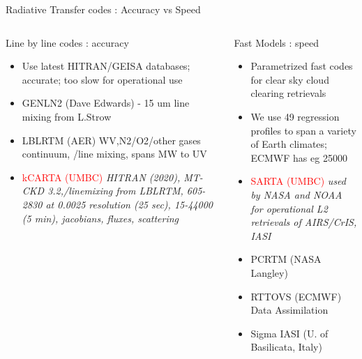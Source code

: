 \documentclass[10pt,t]{beamer}
\begin{document}
\begin{frame}[shrink=2]{Radiative Transfer codes : Accuracy vs Speed}
\vspace{-0.1in}
\begin{columns}

\begin{column}{0.55\columnwidth}
\begin{block}{Line by line codes : accuracy}
  \begin{itemize}
  \item Use latest HITRAN/GEISA databases; accurate; too slow for operational use
  \item GENLN2 (Dave Edwards) - 15 um \cd line mixing from L.Strow
  \item LBLRTM (AER) WV,N2/O2/other gases continuum, \cd/\methane line mixing, spans MW to UV
  \item \textcolor{red}{kCARTA (UMBC)} \emph{HITRAN (2020), MT-CKD 3.2,\cd/\methane linemixing from LBLRTM, 
        605-2830 \wn at 0.0025 \wn resolution (25 sec), 15-44000 \wn (5 min), jacobians, 
        fluxes, scattering}
  \end{itemize}
\end{block}
\end{column}

\begin{column}{0.55\columnwidth}
\begin{block}{Fast Models : speed}
  \begin{itemize}
  \item Parametrized fast codes for clear sky cloud clearing retrievals
  \item We use 49 regression profiles to span a variety of Earth climates; ECMWF has eg 25000
  \item \textcolor{red}{SARTA (UMBC)} \emph{used by NASA and NOAA for operational L2 retrievals of AIRS/CrIS, IASI}
  \item PCRTM (NASA Langley)
  \item RTTOVS (ECMWF) Data Assimilation
  \item Sigma IASI (U. of Basilicata, Italy) 
  \end{itemize}
\end{block}
\end{column}
\end{columns}
\end{frame}
\end{document}
